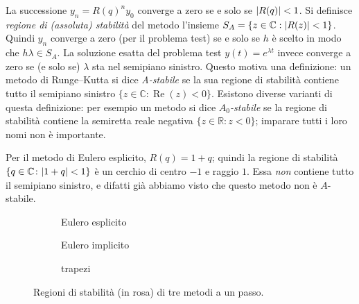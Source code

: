 \documentclass[a4paper]{report}
\DeclarePairedDelimiter{\abs}{\lvert}{\rvert}
\theoremstyle{definiton}
\theoremstyle{remark}
\begin{document}
La successione $y_n = R(q)^n y_0$ converge a zero se e solo se $\abs{R(q)} < 1$. Si definisce \emph{regione di (assoluta) stabilità} del metodo l'insieme $S_A = \{z \in \mathbb{C} : \abs{R(z)}<1\}$. Quindi $y_n$ converge a zero (per il problema test) se e solo se $h$ è scelto in modo che $h\lambda \in S_A$. La soluzione esatta del problema test $y(t) = e^{\lambda t}$ invece converge a zero se (e solo se) $\lambda$ sta nel semipiano sinistro. Questo motiva una definizione: un metodo di Runge--Kutta si dice \emph{A-stabile} se la sua regione di stabilità contiene tutto il semipiano sinistro $\{z\in \mathbb{C} : \operatorname{Re}(z) < 0\}$. Esistono diverse varianti di questa definizione: per esempio un metodo si dice \emph{$A_0$-stabile} se la regione di stabilità contiene la semiretta reale negativa $\{z\in\mathbb{R}: z<0\}$; imparare tutti i loro nomi non è importante.

Per il metodo di Eulero esplicito, $R(q)= 1+q$; quindi la regione di stabilità $\{q\in\mathbb{C} \colon \abs{1+q}<1\}$ è un cerchio di centro $-1$ e raggio $1$. Essa \emph{non} contiene tutto il semipiano sinistro, e difatti già abbiamo visto che questo metodo non è $A$-stabile.

\begin{figure}[ht]
    \centering
    \begin{subfigure}{0.3\textwidth}
        \centering
        \caption{Eulero esplicito}
    \end{subfigure}
    \hfill
    \begin{subfigure}{0.3\textwidth}
        \centering
        \caption{Eulero implicito}
    \end{subfigure}
    \hfill
    \begin{subfigure}{0.3\textwidth}
        \centering
        \caption{trapezi}
    \end{subfigure}
    \caption{Regioni di stabilità (in rosa) di tre metodi a un passo.}
\end{figure}
\end{document}

